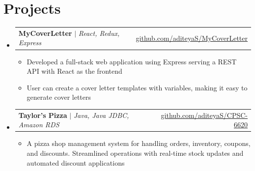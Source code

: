 \documentclass[letterpaper,11pt]{article}
\makeatletter
\newcommand{\sectionItemListStart}{\begin{itemize}[leftmargin=0.15in, label={}]}
\newcommand{\sectionItemListEnd}{\end{itemize}}
\newcommand{\projectHeading}[2]{
    \item
    \begin{tabular*}{0.97\textwidth}{l@{\extracolsep{\fill}}r}
      \small#1 & #2 \\
    \end{tabular*}\vspace{-7pt}
}
\newcommand{\bulletListStart}{\begin{itemize}}
\newcommand{\bulletListEnd}{\end{itemize}\vspace{-5pt}}
\newcommand{\bulletListItem}[1]{\item\small{{#1 \vspace{-2pt}}}}
\makeatother
\begin{document}
\section{Projects}
    \sectionItemListStart
        \projectHeading
            {\textbf{MyCoverLetter} $|$ \emph{React, Redux, Express}}
            {\href{https://github.com/aditeyaS/MyCoverLetter}{\underline{github.com/aditeyaS/MyCoverLetter}}}
            \bulletListStart
                \bulletListItem{Developed a full-stack web application using Express serving a REST API with React as the frontend}
                \bulletListItem{User can create a cover letter templates with variables, making it easy to generate cover letters}
            \bulletListEnd

        \projectHeading
            {\textbf{Taylor’s Pizza} $|$ \emph{Java, Java JDBC, Amazon RDS}}
            {\href{https://github.com/aditeyaS/CPSC-6620}{\underline{github.com/aditeyaS/CPSC-6620}}}
            \bulletListStart
                \bulletListItem{A pizza shop management system for handling orders, inventory, coupons, and discounts. Streamlined operations with real-time stock updates and automated discount applications}
            \bulletListEnd
    \sectionItemListEnd
\end{document}
